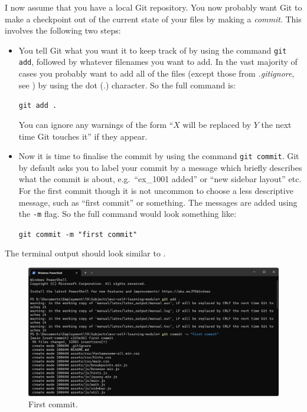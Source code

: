 \documentclass[a4paper,10pt]{article}
\begin{document}
I now assume that you have a local Git repository. You now probably want Git to make a checkpoint out of the current state of your files by making a \emph{commit}. This involves the following two steps:
\begin{itemize}
    \item You tell Git what you want it to keep track of by using the command \texttt{git add}, followed by whatever filenames you want to add. In the vast majority of cases you probably want to add all of the files (except those from \emph{.gitignore}, see ) by using the dot (.) character. So the full command is:

    \texttt{git add .}

    You can ignore any warnings of the form ``$X$ will be replaced by $Y$ the next time Git touches it'' if they appear.

    \item Now it is time to finalise the commit by using the command \texttt{git commit}. Git by default asks you to label your commit by a message which briefly describes what the commit is about, e.g.\ ``ex\_1001 added'' or ``new sidebar layout'' etc. For the first commit though it is not uncommon to choose a less descriptive message, such as ``first commit'' or something. The messages are added using the \texttt{-m} flag. So the full command would look something like:

    \texttt{git commit -m "first commit"}    
\end{itemize}
The terminal output should look similar to .

\begin{figure}[htbp]
    \centering
    \includegraphics[width=\textwidth]{first_commit.png}
    \caption{First commit.}
    \label{fig:first_commit}   
\end{figure}
\end{document}

